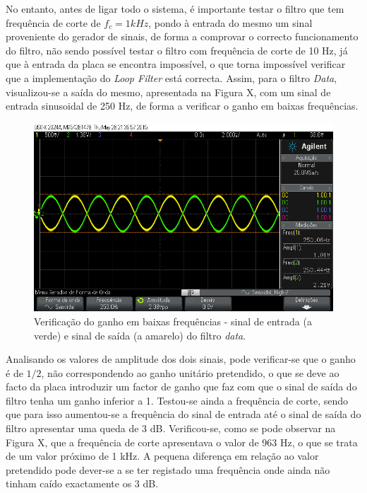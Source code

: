 \documentclass[11pt]{article}
\numberwithin{equation}{section}
\begin{document}
No entanto, antes de ligar todo o sistema, é importante testar o filtro que tem frequência de corte de $f_c = 1 kHz$, pondo à entrada do mesmo um sinal proveniente do gerador de sinais, de forma a comprovar o correcto funcionamento do filtro, não sendo possível testar o filtro com frequência de corte de 10 Hz, já que à entrada da placa se encontra impossível, o que torna impossível verificar que a implementação do \textit{Loop Filter} está correcta. Assim, para o filtro \textit{Data}, visualizou-se a saída do mesmo, apresentada na Figura X, com um sinal de entrada sinusoidal de 250 Hz, de forma a verificar o ganho em baixas frequências.

\begin{figure}[H]
	\centering
	\includegraphics[keepaspectratio=true, scale=0.37]{exps/filtro_1k_baixafreq}
	\caption{Verificação do ganho em baixas frequências - sinal de entrada (a verde) e sinal de saída (a amarelo) do filtro \textit{data}.}
	\vspace{-0.8em}
\end{figure} 

Analisando os valores de amplitude dos dois sinais, pode verificar-se que o ganho é de $1/2$, não correspondendo ao ganho unitário pretendido, o que se deve ao facto da placa introduzir um factor de ganho que faz com que o sinal de saída do filtro tenha um ganho inferior a 1. 
Testou-se ainda a frequência de corte, sendo que para isso aumentou-se a frequência do sinal de entrada até o sinal de saída do filtro apresentar uma queda de 3 dB. Verificou-se, como se pode observar na Figura X, que a frequência de corte apresentava o valor de 963 Hz, o que se trata de um valor próximo de 1 kHz. A pequena diferença em relação ao valor pretendido pode dever-se a se ter registado uma frequência onde ainda não tinham caído exactamente os 3 dB.
\end{document}
